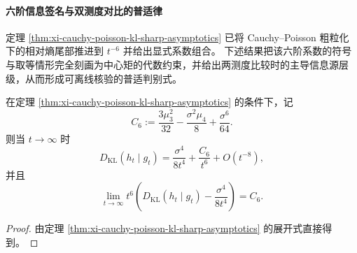 

\paragraph{六阶信息签名与双测度对比的普适律}\label{para:xi-poisson-sixth-order-audit-laws}
定理 \ref{thm:xi-cauchy-poisson-kl-sharp-asymptotics} 已将 Cauchy--Poisson 粗粒化下的相对熵尾部推进到 \(t^{-6}\) 并给出显式系数组合。
下述结果把该六阶系数的符号与取等情形完全刻画为中心矩的代数约束，并给出两测度比较时的主导信息源层级，从而形成可离线核验的普适判别式。

\begin{corollary}[相对熵二项锐渐近的极限等价式]\label{cor:xi-cauchy-poisson-kl-two-term-limit}
在定理 \ref{thm:xi-cauchy-poisson-kl-sharp-asymptotics} 的条件下，记
\[
C_6:=\frac{3\mu_3^2}{32}-\frac{\sigma^2\mu_4}{8}+\frac{\sigma^6}{64}.
\]
则当 \(t\to\infty\) 时
\[
D_{\mathrm{KL}}(h_t\mid g_t)=\frac{\sigma^4}{8t^4}+\frac{C_6}{t^6}+O(t^{-8}),
\]
并且
\[
\lim_{t\to\infty}t^6\!\left(D_{\mathrm{KL}}(h_t\mid g_t)-\frac{\sigma^4}{8t^4}\right)=C_6.
\]
\end{corollary}
\begin{proof}
由定理 \ref{thm:xi-cauchy-poisson-kl-sharp-asymptotics} 的展开式直接得到。
\end{proof}

